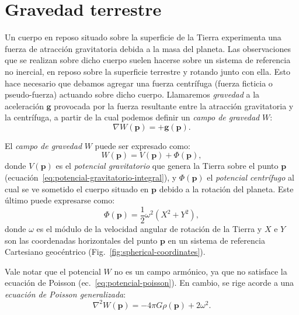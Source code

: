 
\section{Gravedad terrestre}
\label{sec:gravedad-terrestre}

Un cuerpo en reposo situado sobre la superficie de la Tierra experimenta una
fuerza de atracción gravitatoria debida a la masa del planeta.
Las observaciones que se realizan sobre dicho cuerpo suelen hacerse sobre un
sistema de referencia no inercial, en reposo sobre la superficie terrestre
y rotando junto con ella.
Esto hace necesario que debamos agregar una fuerza centrífuga (fuerza ficticia
o pseudo-fuerza) actuando sobre dicho cuerpo.
Llamaremos \emph{gravedad} a la aceleración $\mathbf{g}$ provocada por la
fuerza resultante entre la atracción gravitatoria y la centrífuga, a partir de
la cual podemos definir un
\emph{campo de gravedad} $W$:
%
\begin{equation}
    \nabla W(\mathbf{p}) = +\mathbf{g}(\mathbf{p}).
    \label{eq:campo-gravedad-terrestre}
\end{equation}

El \emph{campo de gravedad} $W$ puede ser expresado como:
%
\begin{equation}
    W(\mathbf{p}) = V(\mathbf{p}) + \Phi(\mathbf{p}),
\end{equation}
%
donde $V(\mathbf{p})$ es el \emph{potencial gravitatorio} que genera
la Tierra sobre el punto $\mathbf{p}$
(ecuación~\ref{eq:potencial-gravitatorio-integral}), y $\Phi(\mathbf{p})$ el
\emph{potencial centrífugo} al cual se ve sometido el cuerpo situado en
$\mathbf{p}$ debido a la rotación del planeta.
Este último puede expresarse como:
%
\begin{equation}
    \Phi(\mathbf{p}) = \frac{1}{2} \omega^2 (X^2 + Y^2),
    \label{eq:potencial-centrifugo}
\end{equation}
%
donde $\omega$ es el módulo de la velocidad angular de rotación de la
Tierra y $X$ e $Y$ son las coordenadas horizontales del punto $\mathbf{p}$ en
un sistema de referencia Cartesiano geocéntrico
(Fig.~\ref{fig:spherical-coordinates}).

Vale notar que el potencial $W$ no es un campo armónico, ya que no satisface
la ecuación de Poisson (ec.~\ref{eq:potencial-poisson}). En cambio, se rige
acorde a una \emph{ecuación de Poisson generalizada}:
%
\begin{equation}
    \nabla^2 W(\mathbf{p}) = - 4\pi G \rho(\mathbf{p}) + 2 \omega^2.
\end{equation}

